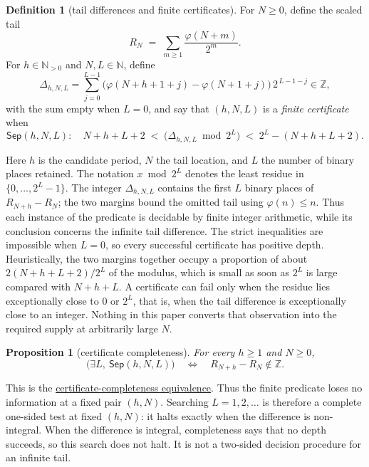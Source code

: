 \documentclass[11pt]{article}
\newcommand{\commit}{ebc98ee71f6819bd9fe344a0bb343542c604e533}
\newcommand{\repobase}{https://github.com/wcook04/plectis-lean-erdos249-257/blob/\commit}
\newcommand{\PK}{Erdos249257}
\newcommand{\lword}[4]{\href{\repobase/\PK/#1\#L#2}{#4}}
\newtheorem{proposition}[theorem]{Proposition}
\theoremstyle{definition}
\newtheorem{definition}[theorem]{Definition}
\theoremstyle{remark}
\newcommand{\N}{\mathbb{N}}
\newcommand{\Npos}{\mathbb{N}_{>0}}
\newcommand{\Z}{\mathbb{Z}}
\newcommand{\ph}{\varphi}
\begin{document}
\begin{definition}[tail differences and finite certificates]
\label{def:totient-certificate}
For $N\ge0$, define the scaled tail
\[
R_N \;=\; \sum_{m\ge1}\frac{\ph(N+m)}{2^m}.
\]
For $h\in\Npos$ and $N,L\in\N$, define
\[
\Delta_{h,N,L}=\sum_{j=0}^{L-1}\big(\ph(N+h+1+j)-\ph(N+1+j)\big)\,2^{\,L-1-j}\in\Z,
\]
with the sum empty when \(L=0\),
and say that $(h,N,L)$ is a \emph{finite certificate} when
\[
\mathsf{Sep}(h,N,L):\quad
N+h+L+2 \;<\; \big(\Delta_{h,N,L}\bmod 2^L\big) \;<\; 2^L-(N+h+L+2).
\]
\end{definition}

Here $h$ is the candidate period, $N$ the tail location, and $L$ the number
of binary places retained.
The notation \(x\bmod 2^L\) denotes the least residue in
\(\{0,\ldots,2^L-1\}\).  The integer $\Delta_{h,N,L}$ contains the first
$L$ binary places of $R_{N+h}-R_N$; the two margins bound the omitted tail
using $\ph(n)\le n$.  Thus each instance of the predicate is decidable by
finite integer arithmetic, while its conclusion concerns the infinite tail
difference.  The strict inequalities are impossible when \(L=0\), so every
successful certificate has positive depth.
Heuristically, the two margins together occupy a proportion of about
\(2(N{+}h{+}L{+}2)/2^L\) of the modulus, which is small as soon as
\(2^L\) is large compared with \(N+h+L\).  A certificate can fail only
when the residue lies exceptionally close to \(0\) or \(2^L\), that is,
when the tail difference is exceptionally close to an integer.  Nothing
in this paper converts that observation into the required supply at
arbitrarily large \(N\).

\begin{proposition}[certificate completeness]\label{res:complete}
For every $h\ge1$ and $N\ge0$,
\[
\bigl(\exists L,\ \mathsf{Sep}(h,N,L)\bigr)
\quad\Longleftrightarrow\quad
R_{N+h}-R_N\notin\Z.
\]
\end{proposition}
\noindent This is the
\lword{LcmConeFlatness.lean}{316}{exists_certifiedKill_iff_tail_diff_notMem_int}{certificate-completeness equivalence}.
Thus the finite predicate loses no information at a fixed pair \((h,N)\).
Searching \(L=1,2,\ldots\) is therefore a complete one-sided test at fixed
\((h,N)\): it halts
exactly when the difference is non-integral.  When the difference is integral,
completeness says that no depth succeeds, so this search does not halt.  It is
not a two-sided decision procedure for an infinite tail.
\end{document}
